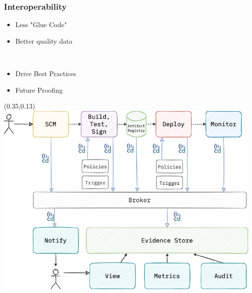\documentclass[aspectratio=169,11pt,hyperref={colorlinks=true}]{beamer}
\begin{document}
\begin{grayframe}
  \frametitle{Interoperability}
  \begin{itemize}
    \item Less "Glue Code"
    \item Better quality data
  \end{itemize}
  ~\\
  \begin{itemize}
    \item Drive Best Practices
    \item Future Proofing
  \end{itemize}
  \begin{textblock*}{0.60\paperwidth}(0.35\paperwidth,0.13\paperheight)
    \includegraphics[width=0.60\paperwidth]{img/cdevents-4-Interoperability.png}
  \end{textblock*}
\end{grayframe}
\end{document}
